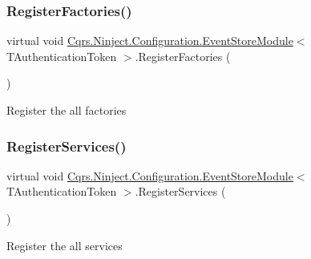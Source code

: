 \subsubsection{\texorpdfstring{Register\+Factories()}{RegisterFactories()}}
{\footnotesize\ttfamily virtual void \hyperlink{classCqrs_1_1Ninject_1_1Configuration_1_1EventStoreModule}{Cqrs.\+Ninject.\+Configuration.\+Event\+Store\+Module}$<$ T\+Authentication\+Token $>$.Register\+Factories (\begin{DoxyParamCaption}{ }\end{DoxyParamCaption})\hspace{0.3cm}{\ttfamily [virtual]}}



Register the all factories 

\mbox{\label{classCqrs_1_1Ninject_1_1Configuration_1_1EventStoreModule_a72c71c7ccd12ca4ef434e3eea4dce7db}} 
\subsubsection{\texorpdfstring{Register\+Services()}{RegisterServices()}}
{\footnotesize\ttfamily virtual void \hyperlink{classCqrs_1_1Ninject_1_1Configuration_1_1EventStoreModule}{Cqrs.\+Ninject.\+Configuration.\+Event\+Store\+Module}$<$ T\+Authentication\+Token $>$.Register\+Services (\begin{DoxyParamCaption}{ }\end{DoxyParamCaption})\hspace{0.3cm}{\ttfamily [virtual]}}



Register the all services 

